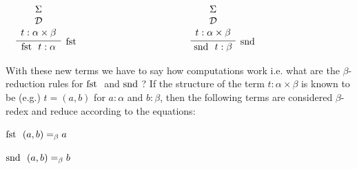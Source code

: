 \documentclass{book}
\begin{document}
            \begin{center}
                $\begin{array} { c c c }
                
                \begin{array}{ c  c  c }			
                     \infer[\fst]{\fst \ t : \alpha}
                        {\begin{array}{c}
                            \Sigma \\
                            \mathcal{D} \\
                            t : \alpha \times \beta
                        \end{array}}
                \end{array}
        
                & \hspace{3cm} &
        
                \begin{array}{ c  c  c }			
                    \infer[\snd]{\snd \ t : \beta}
                    {\begin{array}{c}
                        \Sigma \\
                        \mathcal{D} \\
                        t : \alpha \times \beta
                    \end{array}}	
                \end{array}\\		
        
                \end{array}$
            \end{center}	
        

        With these new terms we have to say how computations work i.e. what are the $\beta$-reduction rules for $\text{fst }$ and  $\text{snd }$? If the structure of the term $t : \alpha \times \beta$ is known to be (e.g.) $t = (a,b)$ for $a: \alpha$ and $b: \beta$, then the following terms are considered $\beta$-redex and reduce according to the equations: 

        \begin{center}
          $\text{fst } \ (a,b) =_{\beta} a$ 
      
          $\text{snd } \ (a,b) =_{\beta} b$ 
        \end{center}
      
\end{document}
